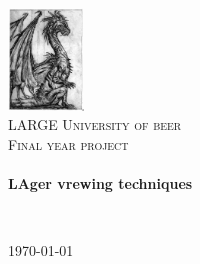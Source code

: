 \begin{titlepage}
\begin{center}

\includegraphics[width=0.15\textwidth]{../images/dragon}~
\\[1cm]

\textsc{LARGE University of beer}\\[1.5cm]

\textsc{\Large Final year project}\\[0.5cm]

\HRule \\[0.4cm]  %
{ \huge \bfseries LAger vrewing techniques \\[0.4cm]}

\HRule \\[1.5cm]

\vfill

{\large \today}

\end{center}
\end{titlepage}
